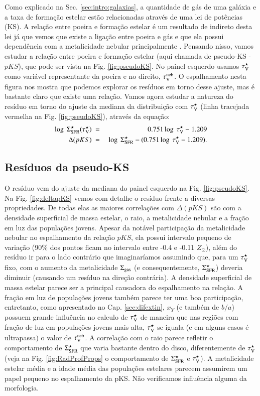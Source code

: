 Como explicado na Sec. \ref{sec:intro:galaxias}, a quantidade de gás de uma galáxia e a taxa de
formação estelar estão relacionadas através de uma lei de potências (KS). A relação entre poeira e
formação estelar é um resultado de indireto desta lei já que vemos que existe a ligação entre poeira
e gás e que ela possui dependência com a metalicidade nebular principalmente \citep[][e suas
referências]{Magdis.etal.2011a, Leroy.etal.2011a, Santini.etal.2014a}. Pensando nisso, vamos estudar
a relação entre poeira e formação estelar (aqui chamada de pseudo-KS - $pKS$), que pode ser vista na
Fig. \ref{fig:pseudoKS}. No painel esquerdo usamos $\tau_{\mathrm{V}}^\star$ como variável representante da poeira e
no direito, $\tau_{\mathrm{V}}^{\mathrm{neb}}$. O espalhamento nesta figura nos mostra que podemos explorar os resíduos em
torno desse ajuste, mas é bastante claro que existe uma relação. Vamos agora estudar a natureza
do resíduo em torno do ajuste da mediana da distribuição com $\tau_{\mathrm{V}}^\star$ (linha tracejada vermelha na
Fig. \ref{fig:pseudoKS}), através da equação:
\begin{eqnarray}
	\log\ \Sigma_{\mathrm{SFR}}^\star(\tau_{\mathrm{V}}^\star)\ &=&\ 0.751 \log\ \tau_{\mathrm{V}}^\star - 1.209 \\
	\label{eq:pKS_1stadj}
	\Delta(pKS)\ &=&\ \log\ \Sigma_{\mathrm{SFR}}^\star - (0.751 \log\ \tau_{\mathrm{V}}^\star - 1.209).
	\label{eq:DeltapKS}
\end{eqnarray}

\subsection{Resíduos da pseudo-KS}
\label{sec:gasfrac:KS:resid}

O resíduo vem do ajuste da mediana do painel esquerdo na Fig. \ref{fig:pseudoKS}. Na Fig.
\ref{fig:deltapKS} vemos com detalhe o resíduo frente a diversas propriedades. De todas elas as
maiores correlações com $\Delta(pKS)$ são com a densidade superficial de massa estelar, o raio, a
metalicidade nebular e a fração em luz das populações jovens. Apesar da notável participação da
metalicidade nebular no espalhamento da relação $pKS$, ela possui intervalo pequeno de variação
(90\% dos pontos ficam no intervalo entre -0.4 e -0.11 $Z_\odot$), além do resíduo ir para o lado
contrário que imaginaríamos assumindo que, para um $\tau_{\mathrm{V}}^\star$ fixo, com o aumento da metalicidade
$\Sigma_{\mathrm{gas}}$ (e consequentemente, $\Sigma_{\mathrm{SFR}}^\star$) deveria diminuir (causando um resíduo na direção
contrária). A densidade superficial de massa estelar parece ser a principal causadora do
espalhamento na relação. A fração em luz de populações jovens também parece ter uma boa
participação, entretanto, como apresentado no Cap. \ref{sec:difextin}, $x_Y$ (e também de $b/a$)
possuem grande influência no calculo de $\tau_{\mathrm{V}}^\star$ de maneira que nas regiões com fração de luz em
populações jovens mais alta, $\tau_{\mathrm{V}}^\star$ se iguala (e em alguns casos é ultrapassa) o valor de
$\tau_{\mathrm{V}}^{\mathrm{neb}}$. A correlação com o raio parece refletir o comportamento de $\Sigma_{\mathrm{SFR}}^\star$ que varia bastante
dentro do disco, diferentemente de $\tau_{\mathrm{V}}^\star$ (veja na Fig. \ref{fig:RadProfProps} o comportamento de
$\Sigma_{\mathrm{SFR}}^\star$ e $\tau_{\mathrm{V}}^\star$). A metalicidade estelar média e a idade média das populações estelares
parecem assumirem um papel pequeno no espalhamento da pKS. Não verificamos influência alguma da
morfologia.

